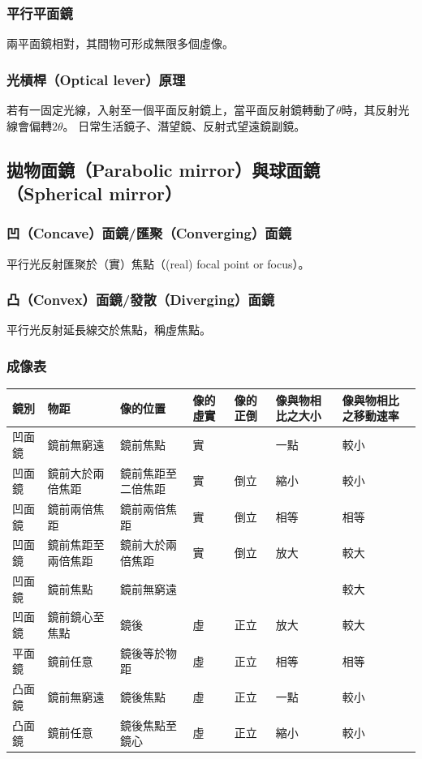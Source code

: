 \documentclass[a4paper,12pt]{report}
\begin{document}
\subsubsection{平行平面鏡}
兩平面鏡相對，其間物可形成無限多個虛像。
\subsubsection{光槓桿（Optical lever）原理}
若有一固定光線，入射至一個平面反射鏡上，當平面反射鏡轉動了$\theta$時，其反射光線會偏轉$2\theta$。
日常生活鏡子、潛望鏡、反射式望遠鏡副鏡。
\subsection{拋物面鏡（Parabolic mirror）與球面鏡（Spherical mirror）}
\subsubsection{凹（Concave）面鏡/匯聚（Converging）面鏡}
平行光反射匯聚於（實）焦點（(real) focal point or focus）。
\subsubsection{凸（Convex）面鏡/發散（Diverging）面鏡}
平行光反射延長線交於焦點，稱虛焦點。
\subsubsection{成像表}
\bct
\begin{longtable}[c]{|p{0.05\tw}|p{0.15\tw}|p{0.15\tw}|p{0.05\tw}|p{0.05\tw}|p{0.1\tw}|p{0.1\tw}|}
\hline
鏡別  & 物距        & 像的位置      & 像的虛實 & 像的正倒 & 像與物相比之大小 & 像與物相比之移動速率 \\\hline\endhead
凹面鏡 & 鏡前無窮遠     & 鏡前焦點      & 實    &      & 一點       & 較小         \\\hline
凹面鏡 & 鏡前大於兩倍焦距  & 鏡前焦距至二倍焦距 & 實    & 倒立   & 縮小       & 較小         \\\hline
凹面鏡 & 鏡前兩倍焦距    & 鏡前兩倍焦距    & 實    & 倒立   & 相等       & 相等         \\\hline
凹面鏡 & 鏡前焦距至兩倍焦距 & 鏡前大於兩倍焦距  & 實    & 倒立   & 放大       & 較大         \\\hline
凹面鏡 & 鏡前焦點      & 鏡前無窮遠       &      &      &          & 較大         \\\hline
凹面鏡 & 鏡前鏡心至焦點   & 鏡後        & 虛    & 正立   & 放大       & 較大         \\\hline
平面鏡 & 鏡前任意      & 鏡後等於物距    & 虛    & 正立   & 相等       & 相等         \\\hline
凸面鏡 & 鏡前無窮遠     & 鏡後焦點      & 虛    & 正立   & 一點       & 較小         \\\hline
凸面鏡 & 鏡前任意      & 鏡後焦點至鏡心   & 虛    & 正立   & 縮小       & 較小         \\\hline
\end{longtable}
\FB\ect
\end{document}
